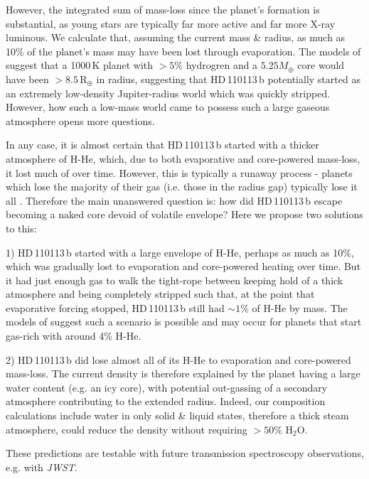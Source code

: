 \documentclass[fleqn,usenatbib]{mnras}
\newcommand{\rearth}{R$_{\oplus}$}
\newcommand{\Tplanet}{HD\,110113\,b}
\begin{document}
However, the integrated sum of mass-loss since the planet's formation is substantial, as young stars are typically far more active and far more X-ray luminous.
We calculate that, assuming the current mass \& radius, as much as 10\% of the planet's mass may have been lost through evaporation.
The models of \citet{zeng2019growth} suggest that a 1000\,K planet with $\gt5$\% hydrogren and a $5.25M_\oplus$ core would have been $\gt8.5$\,\rearth{} in radius, suggesting that \Tplanet{} potentially started as an extremely low-density Jupiter-radius world which was quickly stripped.
However, how such a low-mass world came to possess such a large gaseous atmosphere opens more questions.

In any case, it is almost certain that \Tplanet{} started with a thicker atmosphere of H-He, which, due to both evaporative and core-powered mass-loss, it lost much of over time.
However, this is typically a runaway process - planets which lose the majority of their gas (i.e. those in the radius gap) typically lose it all \citep{owen2017evaporation}.
Therefore the main unanswered question is: how did \Tplanet{} escape becoming a naked core devoid of volatile envelope?
Here we propose two solutions to this:

1) \Tplanet{} started with a large envelope of H-He, perhaps as much as 10\%, which was gradually lost to evaporation and core-powered heating over time. 
But it had just enough gas to walk the tight-rope between keeping hold of a thick atmosphere and being completely stripped such that, at the point that evaporative forcing stopped, \Tplanet{} still had $\sim1\%$ of H-He by mass.
The models of \citet[][Figure 5.]{rogers2020unveiling} suggest such a scenario is possible and may occur for planets that start gas-rich with around 4\% H-He.

2) \Tplanet{} did lose almost all of its H-He to evaporation and core-powered mass-loss.
The current density is therefore explained by the planet having a large water content (e.g. an icy core), with potential out-gassing of a secondary atmosphere contributing to the extended radius.
Indeed, our composition calculations include water in only solid \& liquid states, therefore a thick steam \citep[or supercritical][]{mousis2020irradiated} atmosphere, could reduce the density without requiring $\gt50\%$ H$_{2}$O.

These predictions are testable with future transmission spectroscopy observations, e.g. with \textit{JWST}.
\end{document}
